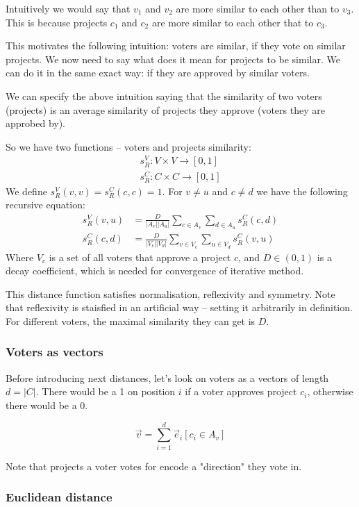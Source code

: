 \documentclass{article}
\begin{document}
Intuitively we would say that $v_1$ and $v_2$ are more similar to each other
than to $v_3$. This is because projects $c_1$ and $c_2$ are more similar to
each other that to $c_3$.

This motivates the following intuition: voters are similar, if they vote on
similar projects. We now need to say what does it mean for projects to be
similar. We can do it in the same exact way: if they are approved by similar
voters. 

We can specify the above intuition saying that the similarity of two voters
(projects) is an average similarity of projects they approve (voters they are
approbed by).

So we have two functions -- voters and projects similarity:
\begin{align*}
  s^V_R : V \times V \to [0, 1] \\
  s^C_R : C \times C \to [0, 1]
\end{align*}
We define $s^V_R(v,v)=s^C_R(c,c)=1$. For $v \neq u$ and $c \neq d$
we have the following recursive equation:
\begin{align*}
  s^V_R(v, u) &= \frac{D}{|A_v| |A_u|} \sum_{c \in A_v} \sum_{d \in A_u} s^C_R(c, d) \\
  s^C_R(c, d) &= \frac{D}{|V_c| |V_d|} \sum_{v \in V_c} \sum_{u \in V_d} s^C_R(v, u)
\end{align*}
Where $V_c$ is a set of all voters that approve a project $c$, and
$D \in (0, 1)$ is a decay coefficient, which is needed for convergence of
iterative method.

This distance function satisfies normalisation, reflexivity and symmetry.
Note that reflexivity is staisfied in an artificial way -- setting it
arbitrarily in definition. For different voters, the maximal similarity they
can get is $D$.

\subsubsection*{Voters as vectors}

Before introducing next distances, let's look on voters as a vectors of length
$d = |C|$. There would be a 1 on position $i$ if a voter approves project $c_i$,
otherwise there would be a 0.

\[ \vec v = \sum_{i=1}^d \vec e_i [c_i \in A_v] \]

Note that projects a voter votes for encode a "direction" they vote in.

\subsubsection{Euclidean distance}
\end{document}
